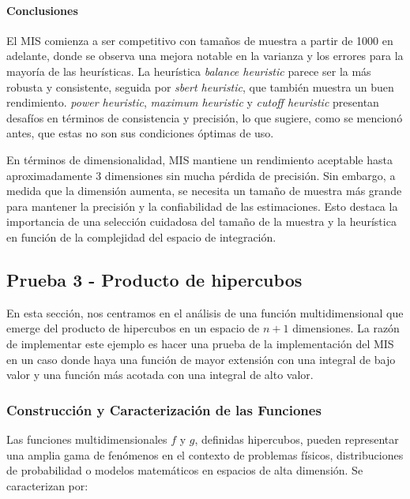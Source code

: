 \documentclass{article}
\begin{document}
\paragraph{Conclusiones}
El MIS comienza a ser competitivo con tamaños de muestra a partir de 1000 en adelante, donde se observa una mejora notable en la varianza y los errores para la mayoría de las heurísticas. La heurística \textit{balance heuristic} parece ser la más robusta y consistente, seguida por \textit{sbert heuristic}, que también muestra un buen rendimiento. \textit{power heuristic}, \textit{maximum heuristic} y \textit{cutoff heuristic} presentan desafíos en términos de consistencia y precisión, lo que sugiere, como se mencionó antes, que estas no son sus condiciones óptimas de uso.

En términos de dimensionalidad, MIS mantiene un rendimiento aceptable hasta aproximadamente 3 dimensiones sin mucha pérdida de precisión. Sin embargo, a medida que la dimensión aumenta, se necesita un tamaño de muestra más grande para mantener la precisión y la confiabilidad de las estimaciones. Esto destaca la importancia de una selección cuidadosa del tamaño de la muestra y la heurística en función de la complejidad del espacio de integración.

\subsection{Prueba 3 - Producto de hipercubos}

En esta sección, nos centramos en el análisis de una función multidimensional que emerge del producto de hipercubos en un espacio de \( n + 1 \) dimensiones.
La razón de implementar este ejemplo es hacer una prueba de la implementación del MIS en un caso donde haya una función de mayor extensión con una integral de bajo valor y una función más acotada con una integral de alto valor.

\subsubsection{Construcción y Caracterización de las Funciones}
Las funciones multidimensionales \( f \) y \( g \), definidas hipercubos, pueden representar una amplia gama de fenómenos en el contexto de problemas físicos, distribuciones de probabilidad o modelos matemáticos en espacios de alta dimensión. Se caracterizan por:
\end{document}
